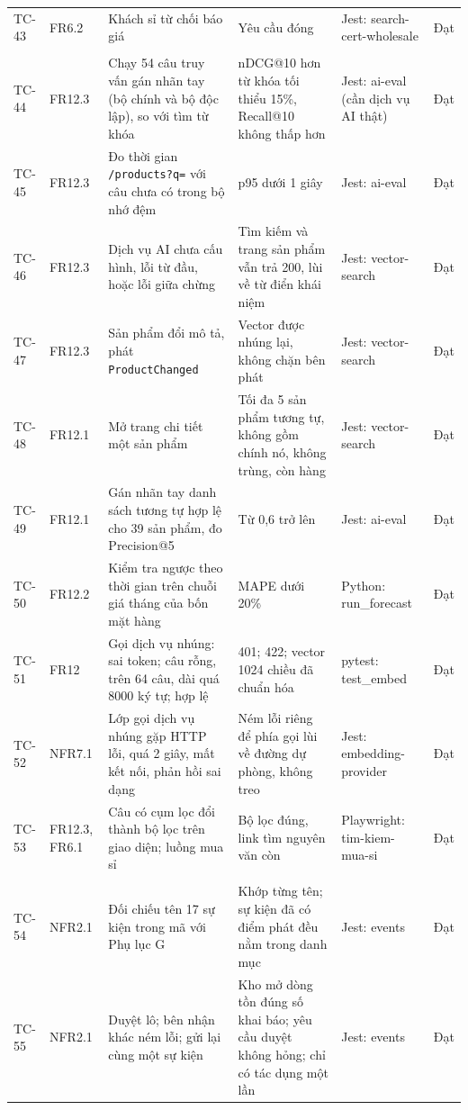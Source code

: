 \begin{longtable}{L{1.40cm} L{1.55cm} L{4.00cm} L{4.05cm} L{1.95cm} L{1.95cm}}
TC-43 & FR6.2 & Khách sỉ từ chối báo giá & Yêu cầu đóng & Jest: search-cert-wholesale & Đạt \\
 \\
TC-44 & FR12.3 & Chạy 54 câu truy vấn gán nhãn tay (bộ chính và bộ độc lập), so với tìm từ khóa & nDCG@10 hơn từ khóa tối thiểu 15\%, Recall@10 không thấp hơn & Jest: ai-eval (cần dịch vụ AI thật) & Đạt \\
TC-45 & FR12.3 & Đo thời gian \texttt{/products?q=} với câu chưa có trong bộ nhớ đệm & p95 dưới 1 giây & Jest: ai-eval & Đạt \\
TC-46 & FR12.3 & Dịch vụ AI chưa cấu hình, lỗi từ đầu, hoặc lỗi giữa chừng & Tìm kiếm và trang sản phẩm vẫn trả 200, lùi về từ điển khái niệm & Jest: vector-search & Đạt \\
TC-47 & FR12.3 & Sản phẩm đổi mô tả, phát \texttt{ProductChanged} & Vector được nhúng lại, không chặn bên phát & Jest: vector-search & Đạt \\
TC-48 & FR12.1 & Mở trang chi tiết một sản phẩm & Tối đa 5 sản phẩm tương tự, không gồm chính nó, không trùng, còn hàng & Jest: vector-search & Đạt \\
TC-49 & FR12.1 & Gán nhãn tay danh sách tương tự hợp lệ cho 39 sản phẩm, đo Precision@5 & Từ 0,6 trở lên & Jest: ai-eval & Đạt \\
TC-50 & FR12.2 & Kiểm tra ngược theo thời gian trên chuỗi giá tháng của bốn mặt hàng & MAPE dưới 20\% & Python: run\_forecast & Đạt \\
TC-51 & FR12 & Gọi dịch vụ nhúng: sai token; câu rỗng, trên 64 câu, dài quá 8000 ký tự; hợp lệ & 401; 422; vector 1024 chiều đã chuẩn hóa & pytest: test\_embed & Đạt \\
TC-52 & NFR7.1 & Lớp gọi dịch vụ nhúng gặp HTTP lỗi, quá 2 giây, mất kết nối, phản hồi sai dạng & Ném lỗi riêng để phía gọi lùi về đường dự phòng, không treo & Jest: embedding-provider & Đạt \\
TC-53 & FR12.3, FR6.1 & Câu có cụm lọc đổi thành bộ lọc trên giao diện; luồng mua sỉ & Bộ lọc đúng, link tìm nguyên văn còn & Playwright: tim-kiem-mua-si & Đạt \\
 \\
TC-54 & NFR2.1 & Đối chiếu tên 17 sự kiện trong mã với Phụ lục G & Khớp từng tên; sự kiện đã có điểm phát đều nằm trong danh mục & Jest: events & Đạt \\
TC-55 & NFR2.1 & Duyệt lô; bên nhận khác ném lỗi; gửi lại cùng một sự kiện & Kho mở dòng tồn đúng số khai báo; yêu cầu duyệt không hỏng; chỉ có tác dụng một lần & Jest: events & Đạt \\

\end{longtable}
